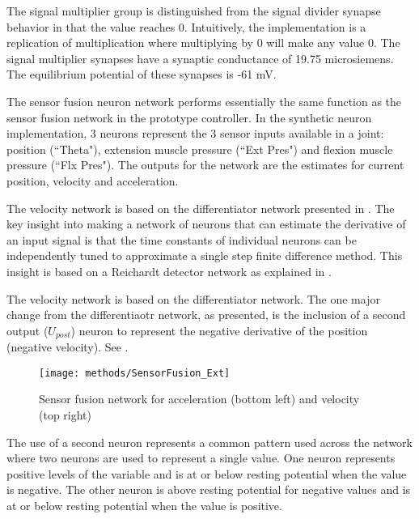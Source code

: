 The signal multiplier group is distinguished from the signal divider synapse
behavior in that the value reaches 0. Intuitively, the implementation is a replication of 
multiplication where multiplying by 0 will make any value 0.
The signal multiplier synapses have a synaptic conductance of 19.75 microsiemens. The equilibrium potential 
of these synapses is -61 mV.


The sensor fusion neuron network performs essentially the same function as the
sensor fusion network in the prototype controller. In the synthetic neuron implementation, 3 neurons
represent the 3 sensor inputs available in a joint: position (``Theta"),
extension muscle pressure (``Ext Pres") and flexion muscle pressure
(``Flx Pres"). The outputs for the network are the estimates for current 
position, velocity and acceleration.



The velocity network is based on the differentiator network presented in 
\cite{NickFunctionalSubnetwork}. The key insight into making a network
of neurons that can estimate the derivative of an input signal is that
the time constants of individual neurons can be independently tuned to 
approximate a single step finite difference method. This insight is based
on a Reichardt detector network as explained in
\cite{NickFunctionalSubnetwork}.


The velocity network is based on the differentiator network. 
The one major change from the differentiaotr network,
as presented, is the inclusion of a second output ($U_{post}$) neuron to 
represent the negative derivative of the position (negative velocity). See .

\begin{figure}
\centering
\texttt{[image: methods/SensorFusion\_Ext]}
\caption{Sensor fusion network for acceleration (bottom left) and velocity (top right)}
\label{fig:SensorFusion}
\end{figure}

The use of a second neuron represents
a common pattern used across the network where two neurons are used to represent
a single value. One neuron represents positive levels of the variable and is 
at or below resting potential when the value is negative. The other neuron is
above resting potential for negative values and is at or below resting potential
when the value is positive. 

